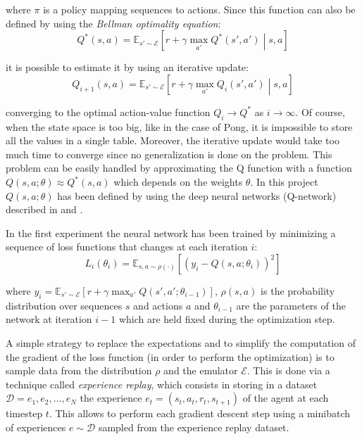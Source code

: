 \documentclass[a4paper]{article}
\numberwithin{equation}{section} %
\numberwithin{figure}{section} %
\numberwithin{table}{section} %
\theoremstyle{definition}
\begin{document}
\noindent where $\pi$ is a policy mapping sequences to actions. Since this function
can also be defined by using the \textit{Bellman optimality equation}:
\begin{equation*}
	Q^*(s, a) = \mathbb{E}_{s' \sim \mathcal{E}} \left[ r + \gamma \max_{a'} Q^*(s', a') \middle| s, a \right]
\end{equation*}

\noindent it is possible to estimate it by using an iterative update:
\begin{equation*}
	Q_{i+1}(s, a) = \mathbb{E}_{s' \sim \mathcal{E}} \left[ r + \gamma \max_{a'} Q_{i}(s', a') \middle| s, a \right]
\end{equation*}

\noindent converging to the optimal action-value function $Q_i \rightarrow Q^*$
as $i \rightarrow \infty$. Of course, when the state space is too big, like
in the case of Pong, it is impossible to store all the values in a single table.
Moreover, the iterative update would take too much time to converge since no
generalization is done on the problem. This problem can be easily handled by
approximating the Q function with a function $Q(s, a; \theta) \approx Q^*(s, a)$
which depends on the weights $\theta$. In this project $Q(s, a; \theta)$ has been
defined by using the deep neural networks (Q-network) described in
\cite{mnih2013playing} and \cite{mnih2015humanlevel}.

In the first experiment the neural network has been trained by minimizing
a sequence of loss functions that changes at each iteration $i$:
\begin{equation}
	\label{eq:loss-function-dqn13}
	L_i(\theta_i) = \mathbb{E}_{s, a \sim \rho(\cdot)} \left[ (y_i - Q(s, a; \theta_i))^2 \right]
\end{equation}

\noindent where $y_i = \mathbb{E}_{s' \sim \mathcal{E}} \left[ r + \gamma \max_{a'} Q(s', a'; \theta_{i-1}) \right]$,
$\rho(s, a)$ is the probability distribution over sequences $s$ and actions $a$
and $\theta_{i-1}$ are the parameters of the network at iteration $i-1$ which
are held fixed during the optimization step.

A simple strategy to replace the expectations and to simplify the computation
of the gradient of the
loss function (in order to perform the optimization) is to sample data from the
distribution $\rho$ and the emulator $\mathcal{E}$. This is done via a technique
called \textit{experience replay}, which consists in storing in a dataset
$\mathcal{D} = e_1, e_2, \dots, e_N$ the experience
$e_t = \left( s_t, a_t, r_t, s_{t+1} \right)$ of the agent at each timestep $t$.
This allows to perform each gradient descent step using a minibatch of experiences
$e \sim \mathcal{D}$
sampled from the experience replay dataset.
\end{document}
